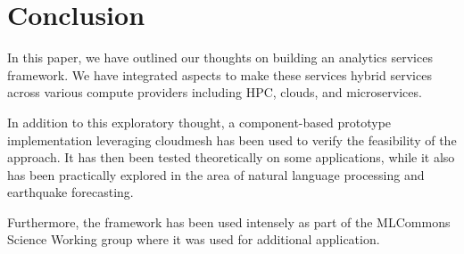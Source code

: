 \section{Conclusion}

In this paper, we have outlined our thoughts on building an analytics services framework. We have integrated aspects to make these services hybrid services across various compute providers including HPC, clouds, and microservices.

In addition to this exploratory thought, a component-based prototype implementation leveraging cloudmesh has been used to verify the feasibility of the approach. It has then been tested theoretically on some applications, while it also has been practically explored in the area of natural language processing and earthquake forecasting.

Furthermore, the framework has been used intensely as part of the MLCommons Science Working group where it was used for additional application.
